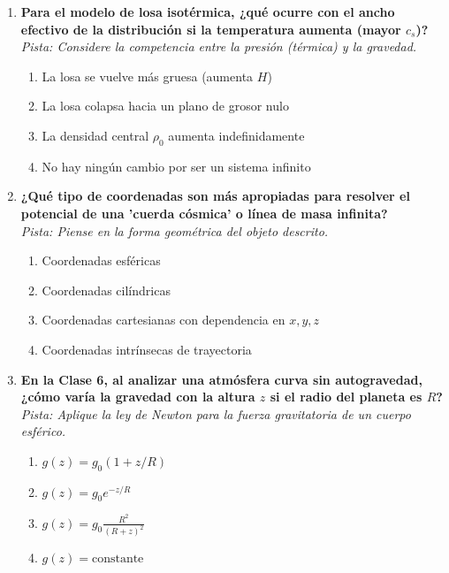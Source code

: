 \documentclass[12pt,a4paper]{article}
\begin{document}
\begin{enumerate}[label=\textbf{\arabic*.}, itemsep=1.5em]
\item \textbf{Para el modelo de losa isotérmica, ¿qué ocurre con el ancho efectivo de la distribución si la temperatura aumenta (mayor $c_s$)?} \\
\textit{Pista: Considere la competencia entre la presión (térmica) y la gravedad.}
\begin{enumerate}[label=\alph*), leftmargin=*]
    \item La losa se vuelve más gruesa (aumenta $H$)
    \item La losa colapsa hacia un plano de grosor nulo
    \item La densidad central $\rho_0$ aumenta indefinidamente
    \item No hay ningún cambio por ser un sistema infinito
\end{enumerate}

\item \textbf{¿Qué tipo de coordenadas son más apropiadas para resolver el potencial de una 'cuerda cósmica' o línea de masa infinita?} \\
\textit{Pista: Piense en la forma geométrica del objeto descrito.}
\begin{enumerate}[label=\alph*), leftmargin=*]
    \item Coordenadas esféricas
    \item Coordenadas cilíndricas
    \item Coordenadas cartesianas con dependencia en $x, y, z$
    \item Coordenadas intrínsecas de trayectoria
\end{enumerate}

\item \textbf{En la Clase 6, al analizar una atmósfera curva sin autogravedad, ¿cómo varía la gravedad con la altura $z$ si el radio del planeta es $R$?} \\
\textit{Pista: Aplique la ley de Newton para la fuerza gravitatoria de un cuerpo esférico.}
\begin{enumerate}[label=\alph*), leftmargin=*]
    \item $g(z) = g_0 (1 + z/R)$
    \item $g(z) = g_0 e^{-z/R}$
    \item $g(z) = g_0 \frac{R^2}{(R+z)^2}$
    \item $g(z) = \text{constante}$
\end{enumerate}


\end{enumerate}
\end{document}
